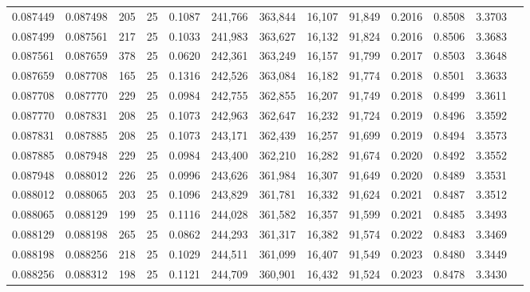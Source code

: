 \begin{tabular}{rrrrrrrrrrrrr}
0.087449 & 0.087498 &   205 &  25 &                                     0.1087 & 241,766 & 363,844 &  16,107 &  91,849 & 0.2016 & 0.8508 & 3.3703 \\
0.087499 & 0.087561 &   217 &  25 &                                     0.1033 & 241,983 & 363,627 &  16,132 &  91,824 & 0.2016 & 0.8506 & 3.3683 \\
0.087561 & 0.087659 &   378 &  25 &                                     0.0620 & 242,361 & 363,249 &  16,157 &  91,799 & 0.2017 & 0.8503 & 3.3648 \\
0.087659 & 0.087708 &   165 &  25 &                                     0.1316 & 242,526 & 363,084 &  16,182 &  91,774 & 0.2018 & 0.8501 & 3.3633 \\
0.087708 & 0.087770 &   229 &  25 &                                     0.0984 & 242,755 & 362,855 &  16,207 &  91,749 & 0.2018 & 0.8499 & 3.3611 \\
0.087770 & 0.087831 &   208 &  25 &                                     0.1073 & 242,963 & 362,647 &  16,232 &  91,724 & 0.2019 & 0.8496 & 3.3592 \\
0.087831 & 0.087885 &   208 &  25 &                                     0.1073 & 243,171 & 362,439 &  16,257 &  91,699 & 0.2019 & 0.8494 & 3.3573 \\
0.087885 & 0.087948 &   229 &  25 &                                     0.0984 & 243,400 & 362,210 &  16,282 &  91,674 & 0.2020 & 0.8492 & 3.3552 \\
0.087948 & 0.088012 &   226 &  25 &                                     0.0996 & 243,626 & 361,984 &  16,307 &  91,649 & 0.2020 & 0.8489 & 3.3531 \\
0.088012 & 0.088065 &   203 &  25 &                                     0.1096 & 243,829 & 361,781 &  16,332 &  91,624 & 0.2021 & 0.8487 & 3.3512 \\
0.088065 & 0.088129 &   199 &  25 &                                     0.1116 & 244,028 & 361,582 &  16,357 &  91,599 & 0.2021 & 0.8485 & 3.3493 \\
0.088129 & 0.088198 &   265 &  25 &                                     0.0862 & 244,293 & 361,317 &  16,382 &  91,574 & 0.2022 & 0.8483 & 3.3469 \\
0.088198 & 0.088256 &   218 &  25 &                                     0.1029 & 244,511 & 361,099 &  16,407 &  91,549 & 0.2023 & 0.8480 & 3.3449 \\
0.088256 & 0.088312 &   198 &  25 &                                     0.1121 & 244,709 & 360,901 &  16,432 &  91,524 & 0.2023 & 0.8478 & 3.3430 \\

\end{tabular}
